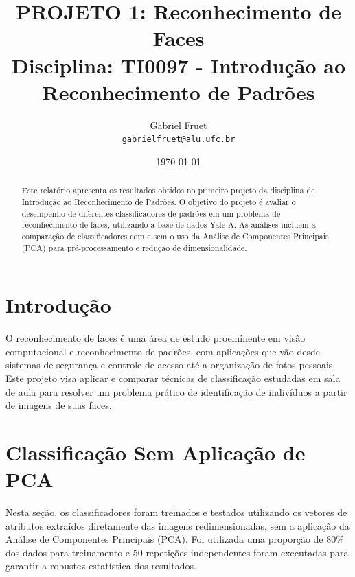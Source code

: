 \documentclass[a4paper, 12pt]{article}
\title{
    \textbf{PROJETO 1: Reconhecimento de Faces} \\
    \large Disciplina: TI0097 - Introdução ao Reconhecimento de Padrões
}
\author{
    Gabriel Fruet \\
    \texttt{gabrielfruet@alu.ufc.br}
}
\date{\today}
\begin{document}
\maketitle %

\begin{abstract}
    Este relatório apresenta os resultados obtidos no primeiro projeto da disciplina de Introdução ao Reconhecimento de Padrões. O objetivo do projeto é avaliar o desempenho de diferentes classificadores de padrões em um problema de reconhecimento de faces, utilizando a base de dados Yale A. As análises incluem a comparação de classificadores com e sem o uso da Análise de Componentes Principais (PCA) para pré-processamento e redução de dimensionalidade.
\end{abstract}

\section{Introdução}
O reconhecimento de faces é uma área de estudo proeminente em visão computacional e reconhecimento de padrões, com aplicações que vão desde sistemas de segurança e controle de acesso até a organização de fotos pessoais. Este projeto visa aplicar e comparar técnicas de classificação estudadas em sala de aula para resolver um problema prático de identificação de indivíduos a partir de imagens de suas faces.

\section{Classificação Sem Aplicação de PCA}
Nesta seção, os classificadores foram treinados e testados utilizando os vetores de atributos extraídos diretamente das imagens redimensionadas, sem a aplicação da Análise de Componentes Principais (PCA). Foi utilizada uma proporção de 80\% dos dados para treinamento e 50 repetições independentes foram executadas para garantir a robustez estatística dos resultados.
\end{document}
